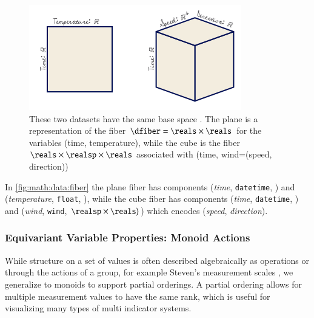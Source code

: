 \documentclass[journal]{vgtc}                %
\begin{document}
\begin{figure}[htb]
  \centering 
  \includegraphics[width=\columnwidth]{fiber.png}
  \caption{These two datasets have the same base space \dbase. The plane is a representation of the fiber $\dfiber=\reals\times\reals$ for the variables (time, temperature),  while the cube is the fiber $\reals\times\realsp\times\reals$ associated with (time, wind=(speed, direction))}
  \label{fig:math:data:fiber}
\end{figure}
In \autoref{fig:math:data:fiber} the plane fiber has components (\emph{time}, \texttt{datetime}, \reals) and (\emph{temperature}, \texttt{float}, \reals), while the cube fiber has components (\emph{time}, \texttt{datetime}, \reals) and (\emph{wind}, \texttt{wind}, \(\realsp\times\reals)\)) which encodes (\emph{speed}, \emph{direction}). 


\subsubsection{Equivariant Variable Properties: Monoid Actions}
\label{sec:math:data:monoid}
While structure on a set of values is often described algebraically as operations or through the actions of a group, for example Steven's measurement scales \cite{stevensTheoryScalesMeasurement1946, leaFormalizationMeasurementScale}, we generalize to monoids to support partial orderings. A partial ordering allows for multiple measurement values to have the same rank\cite{fongInvitationAppliedCategory2019}, which is useful for visualizing many types of multi indicator systems\cite{bruggemannRankingPrioritizationMultiindicator2011}. 
\end{document}

